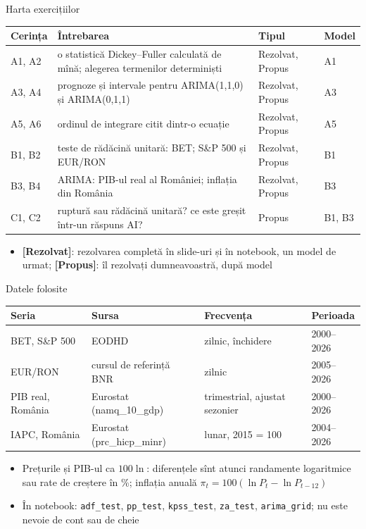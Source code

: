 \begin{frame}{Harta exercițiilor}
\itemsize{\small}
\begin{center}
\footnotesize
\begin{tabular}{>{\raggedright\arraybackslash}p{1.1cm}>{\raggedright\arraybackslash}p{7.5cm}>{\raggedright\arraybackslash}p{1.9cm}>{\raggedright\arraybackslash}p{1.4cm}}
\toprule
\textbf{Cerința} & \textbf{Întrebarea} & \textbf{Tipul} & \textbf{Model} \\
\midrule
A1, A2 & o statistică Dickey--Fuller calculată de mînă; alegerea termenilor determiniști & Rezolvat, Propus & A1 \\
A3, A4 & prognoze și intervale pentru ARIMA(1,1,0) și ARIMA(0,1,1) & Rezolvat, Propus & A3 \\
A5, A6 & ordinul de integrare citit dintr-o ecuație & Rezolvat, Propus & A5 \\
B1, B2 & teste de rădăcină unitară: BET; S\&P 500 și EUR/RON & Rezolvat, Propus & B1 \\
B3, B4 & ARIMA: PIB-ul real al României; inflația din România & Rezolvat, Propus & B3 \\
C1, C2 & ruptură sau rădăcină unitară? ce este greșit într-un răspuns AI? & Propus & B1, B3 \\
\bottomrule
\end{tabular}
\end{center}
\begin{itemize}
    \item \textbf{[Rezolvat]}: rezolvarea completă în slide-uri și în notebook, un model de urmat; \textbf{[Propus]}: îl rezolvați dumneavoastră, după model
\end{itemize}
\end{frame}

\begin{frame}{Datele folosite}
\itemsize{\small}
\begin{center}
\footnotesize
\begin{tabular}{llll}
\toprule
\textbf{Seria} & \textbf{Sursa} & \textbf{Frecvența} & \textbf{Perioada} \\
\midrule
BET, S\&P 500 & EODHD & zilnic, închidere & 2000--2026 \\
EUR/RON & cursul de referință BNR & zilnic & 2005--2026 \\
PIB real, România & Eurostat (namq\_10\_gdp) & trimestrial, ajustat sezonier & 2000--2026 \\
IAPC, România & Eurostat (prc\_hicp\_minr) & lunar, 2015 = 100 & 2004--2026 \\
\bottomrule
\end{tabular}
\end{center}
\begin{itemize}
    \item Prețurile și PIB-ul ca $100\ln$: diferențele sînt atunci randamente logaritmice sau rate de creștere în \%; inflația anuală $\pi_t = 100(\ln P_t - \ln P_{t-12})$
    \item În notebook: \texttt{adf\_test}, \texttt{pp\_test}, \texttt{kpss\_test}, \texttt{za\_test}, \texttt{arima\_grid}; nu este nevoie de cont sau de cheie
\end{itemize}
\end{frame}


